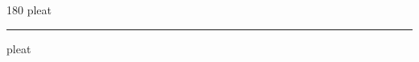 
\begin{frame}
\begin{center}
\begin{turn}{180}
{\fontsize{2.5cm}{1em}\selectfont pleat}
\end{turn}
\vspace{1em}\par  
\hrule
\vspace{1em}\par  
{\fontsize{2.5cm}{1em}\selectfont pleat}
\end{center}
\end{frame}
